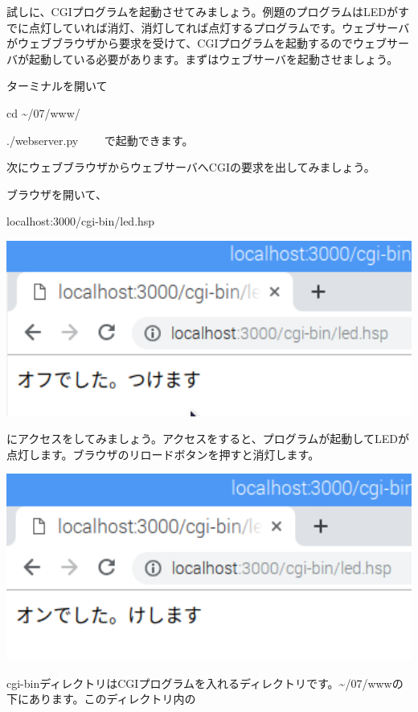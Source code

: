 \documentclass[a4paper,12pt,dvipdfmx]{jarticle}
\begin{document}
試しに、CGIプログラムを起動させてみましょう。例題のプログラムはLEDがすでに点灯していれば消灯、消灯してれば点灯するプログラムです。ウェブサーバがウェブブラウザから要求を受けて、CGIプログラムを起動するのでウェブサーバが起動している必要があります。まずはウェブサーバを起動させましょう。

ターミナルを開いて

cd {\textasciitilde}/07/www/

./webserver.py \ \ \ \ で起動できます。

%


次にウェブブラウザからウェブサーバへCGIの要求を出してみましょう。

ブラウザを開いて、

localhost:3000/cgi-bin/led.hsp

%


\centering
\includegraphics[width=16.574cm]{ome7-img051.png}
\flushleft

にアクセスをしてみましょう。アクセスをすると、プログラムが起動してLEDが点灯します。ブラウザのリロードボタンを押すと消灯します。

\centering
\includegraphics[width=16.166cm]{ome7-img052.png}
\flushleft

cgi-binディレクトリはCGIプログラムを入れるディレクトリです。{\textasciitilde}/07/wwwの下にあります。このディレクトリ内の
\end{document}
